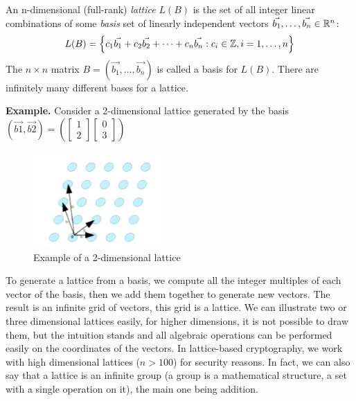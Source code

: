 \begin{definition}[Lattice]
  An n-dimensional (full-rank) \emph{lattice} $L(B)$ is the set of all integer
  linear combinations of some \emph{basis} set of linearly independent vectors
  $\vec{b_1},\dots,\vec{b_n} \in \mathbb{R}^n$:
  \[
    L(B) = \left\{ c_1 \vec{b_1} + c_2 \vec{b_2} + \dots + c_n \vec{b_n} : c_i
      \in \mathbb{Z}, i = 1, \dots, n \right\}
  \]
  The $ n \times n$ matrix $B = (\vec{b_1},\dots, \vec{b_n})$ is called a basis
  for $L(B)$. There are infinitely many different bases for a lattice.
\end{definition}

\textbf{Example.} Consider a 2-dimensional lattice generated by the basis
$(\vec{b1}, \vec{b2}) = \left( \begin{bmatrix} 1 \\ 2
  \end{bmatrix} \begin{bmatrix} 0 \\ 3
  \end{bmatrix}\right)$
\begin{figure}[h]
  \centering \includegraphics{lattices}
  \caption{Example of a 2-dimensional lattice}
  \label{fig:2dimLattice}
\end{figure}
To generate a lattice from a basis, we compute all the integer multiples of
each vector of the basis, then we add them together to generate new vectors. The
result is an infinite grid of vectors, this grid is a lattice. We can illustrate
two or three dimensional lattices easily, for higher dimensions, it is not
possible to draw them, but the intuition stands and all 
algebraic operations can be performed easily on the coordinates of the vectors. In
lattice-based cryptography, we work with high dimensional lattices ($n > 100$) for
security reasons. In fact, we can also say that a lattice is an infinite
group (a group is a mathematical structure, a set with a single operation on it),
the main one being addition.

